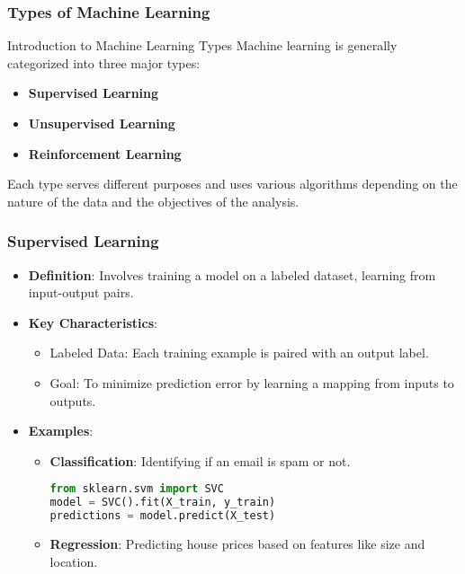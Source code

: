 \documentclass[aspectratio=169]{beamer}
\begin{document}
\begin{frame}
    \frametitle{Types of Machine Learning}
    \begin{block}{Introduction to Machine Learning Types}
        Machine learning is generally categorized into three major types: 
        \begin{itemize}
            \item \textbf{Supervised Learning}
            \item \textbf{Unsupervised Learning}
            \item \textbf{Reinforcement Learning}
        \end{itemize}
        Each type serves different purposes and uses various algorithms depending on the nature of the data and the objectives of the analysis.
    \end{block}
\end{frame}

\begin{frame}[fragile]
    \frametitle{Supervised Learning}
    \begin{itemize}
        \item \textbf{Definition}: Involves training a model on a labeled dataset, learning from input-output pairs.
        \item \textbf{Key Characteristics}:
            \begin{itemize}
                \item Labeled Data: Each training example is paired with an output label.
                \item Goal: To minimize prediction error by learning a mapping from inputs to outputs.
            \end{itemize}
        \item \textbf{Examples}:
            \begin{itemize}
                \item \textbf{Classification}: Identifying if an email is spam or not.
                \begin{lstlisting}[language=Python]
from sklearn.svm import SVC
model = SVC().fit(X_train, y_train)
predictions = model.predict(X_test)
                \end{lstlisting}
                \item \textbf{Regression}: Predicting house prices based on features like size and location.
            \end{itemize}
    \end{itemize}
\end{frame}
\end{document}
